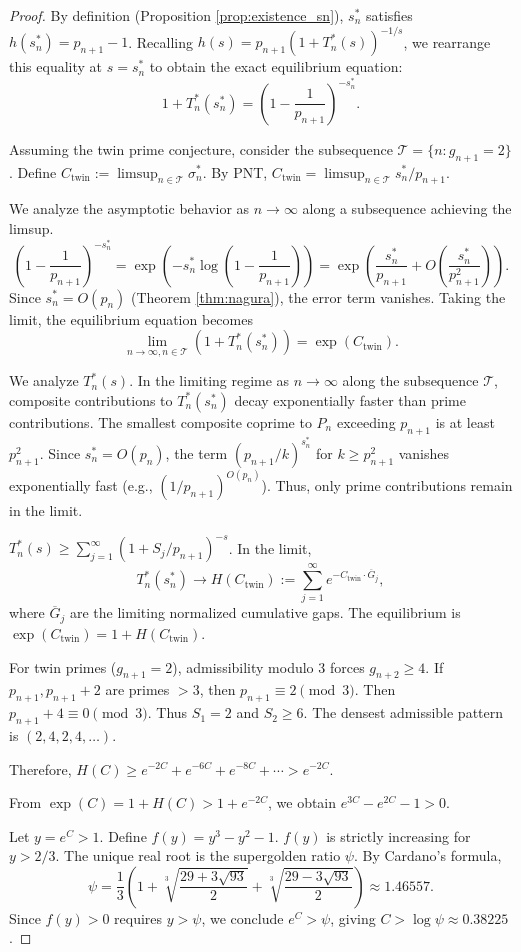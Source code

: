 \documentclass[10pt,a4paper]{amsart}
\begin{document}
\begin{proof}
By definition (Proposition \ref{prop:existence_sn}), $s_n^*$ satisfies $h(s_n^*) = p_{n+1} - 1$. Recalling $h(s) = p_{n+1}(1 + T_n^*(s))^{-1/s}$, we rearrange this equality at $s=s_n^*$ to obtain the exact equilibrium equation:
\[
1 + T_n^*(s_n^*) = \left(1 - \frac{1}{p_{n+1}}\right)^{-s_n^*}.
\]

Assuming the twin prime conjecture, consider the subsequence $\mathcal{T} = \{n : g_{n+1} = 2\}$. Define $C_{\text{twin}} := \limsup_{n \in \mathcal{T}} \sigma_n^*$. By PNT, $C_{\text{twin}} = \limsup_{n \in \mathcal{T}} s_n^*/p_{n+1}$.

We analyze the asymptotic behavior as $n \to \infty$ along a subsequence achieving the limsup.
\[
\left(1 - \frac{1}{p_{n+1}}\right)^{-s_n^*} = \exp\left(-s_n^* \log\left(1 - \frac{1}{p_{n+1}}\right)\right) = \exp\left(\frac{s_n^*}{p_{n+1}} + O\left(\frac{s_n^*}{p_{n+1}^2}\right)\right).
\]
Since $s_n^* = O(p_n)$ (Theorem \ref{thm:nagura}), the error term vanishes. Taking the limit, the equilibrium equation becomes
\[
\lim_{n\to\infty, n\in\mathcal{T}} (1 + T_n^*(s_n^*)) = \exp(C_{\text{twin}}).
\]

We analyze $T_n^*(s)$. In the limiting regime as $n \to \infty$ along the subsequence $\mathcal{T}$, composite contributions to $T_n^*(s_n^*)$ decay exponentially faster than prime contributions. The smallest composite coprime to $P_n$ exceeding $p_{n+1}$ is at least $p_{n+1}^2$. Since $s_n^* = O(p_n)$, the term $(p_{n+1}/k)^{s_n^*}$ for $k \geq p_{n+1}^2$ vanishes exponentially fast (e.g., $(1/p_{n+1})^{O(p_n)}$). Thus, only prime contributions remain in the limit.

$T_n^*(s) \geq \sum_{j=1}^{\infty} (1 + S_j/p_{n+1})^{-s}$. In the limit,
\[
T_n^*(s_n^*) \to H(C_{\text{twin}}) := \sum_{j=1}^{\infty} e^{-C_{\text{twin}} \cdot \overline{G}_j},
\]
where $\overline{G}_j$ are the limiting normalized cumulative gaps. The equilibrium is $\exp(C_{\text{twin}}) = 1 + H(C_{\text{twin}})$.

For twin primes ($g_{n+1} = 2$), admissibility modulo 3 forces $g_{n+2} \geq 4$. If $p_{n+1}, p_{n+1}+2$ are primes $>3$, then $p_{n+1} \equiv 2 \pmod 3$. Then $p_{n+1}+4 \equiv 0 \pmod 3$. Thus $S_1 = 2$ and $S_2 \geq 6$. The densest admissible pattern is $(2, 4, 2, 4, \ldots)$.

Therefore, $H(C) \geq e^{-2C} + e^{-6C} + e^{-8C} + \cdots > e^{-2C}$.

From $\exp(C) = 1 + H(C) > 1 + e^{-2C}$, we obtain $e^{3C} - e^{2C} - 1 > 0$.

Let $y = e^C > 1$. Define $f(y) = y^3 - y^2 - 1$. $f(y)$ is strictly increasing for $y > 2/3$. The unique real root is the supergolden ratio $\psi$. By Cardano's formula,
\[
\psi = \frac{1}{3}\left(1 + \sqrt[3]{\frac{29+3\sqrt{93}}{2}} + \sqrt[3]{\frac{29-3\sqrt{93}}{2}}\right) \approx 1.46557.
\]
Since $f(y) > 0$ requires $y > \psi$, we conclude $e^C > \psi$, giving $C > \log \psi \approx 0.38225$.
\end{proof}
\end{document}
